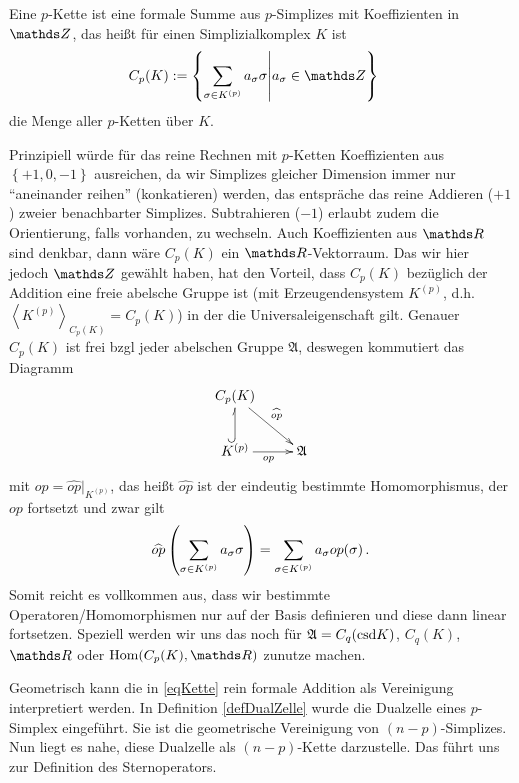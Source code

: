   \begin{definition}
    Eine \( p \)-Kette ist eine formale Summe aus \( p \)-Simplizes mit Koeffizienten in \( \Z \),
    das heißt für einen Simplizialkomplex \( K \) ist
    \begin{align}
      \label{eqKette}
      C_{p}(K) &:= \left\{\sum_{\sigma\in K^{(p)}}a_{\sigma}\sigma \middle| a_{\sigma}\in\Z \right\}
    \end{align}
    die Menge aller \( p \)-Ketten über \( K \).
  \end{definition}
  Prinzipiell würde für das reine Rechnen mit \( p \)-Ketten Koeffizienten aus \( \left\{ +1, 0,  -1 \right\} \) ausreichen,
  da wir Simplizes gleicher Dimension immer nur "`aneinander reihen"' (konkatieren) werden, das entspräche das reine Addieren (\( +1 \)) zweier benachbarter Simplizes.
  Subtrahieren (\( -1 \)) erlaubt zudem die Orientierung, falls vorhanden, zu wechseln.
  Auch Koeffizienten aus \( \R \) sind denkbar, dann wäre \( C_{p}(K) \) ein \( \R \)-Vektorraum.
  Das wir hier jedoch \( \Z \) gewählt haben, hat den Vorteil, dass \( C_{p}(K) \) bezüglich der Addition eine freie abelsche Gruppe ist
  (mit Erzeugendensystem \( K^{(p)} \), d.h.  \( \left\langle K^{(p)} \right\rangle_{C_{p}(K)} = C_{p}(K) \))
  in der die Universaleigenschaft gilt.
  Genauer \( C_{p}(K) \) ist frei bzgl jeder abelschen Gruppe \( \mathfrak{A} \), deswegen kommutiert das Diagramm
  \begin{align}
    \label{diagFreieAbelscheGruppe}
    \begin{xy}
      \xymatrix{
        C_{p}(K) \ar[rd]^{\widehat{op}} & \\
        K^{(p)} \ar@^{(->}[u] \ar[r]_{op}& \mathfrak{A}
      }
    \end{xy}
  \end{align}
  mit \( op = \widehat{op}|_{K^{(p)}} \), das heißt \( \widehat{op} \) ist der eindeutig bestimmte Homomorphismus, der \( op \) fortsetzt und zwar gilt
  \begin{align}
    \widehat{op}\left(\sum_{\sigma\in K^{(p)}}a_{\sigma}\sigma\right) = \sum_{\sigma\in K^{(p)}}a_{\sigma}op(\sigma) \,\text{.}
  \end{align}
  Somit reicht es vollkommen aus, dass wir bestimmte Operatoren/Homomorphismen nur auf der Basis definieren und diese dann linear fortsetzen.
  Speziell werden wir uns das noch für \( \mathfrak{A} = C_{q}(\text{csd} K) \), \( C_{q}(K) \), \( \R \) oder \( \hom(C_{p}(K),\R) \) zunutze machen. 

  Geometrisch kann die in \eqref{eqKette} rein formale Addition als Vereinigung interpretiert werden. 
  In Definition \ref{defDualZelle} wurde die Dualzelle eines \( p \)-Simplex eingeführt. 
  Sie ist die geometrische Vereinigung von \( (n-p) \)-Simplizes.
  Nun liegt es nahe, diese Dualzelle als \( (n-p) \)-Kette darzustelle.
  Das führt uns zur Definition des Sternoperators.

